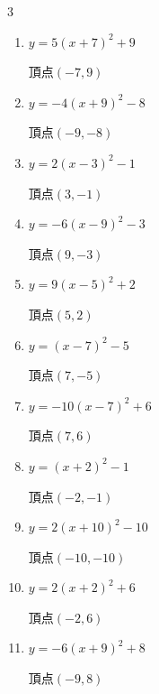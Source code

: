 \begin{multicols}{3}
\begin{enumerate}
        $\displaystyle 頂点\left( 2 , 10 \right)$

  \item $\displaystyle y=5\left( x+7\right)^{2}+9$

        $\displaystyle 頂点\left( -7 , 9 \right)$

  \item $\displaystyle y=-4\left( x+9\right)^{2}-8$

        $\displaystyle 頂点\left( -9 , -8 \right)$

  \item $\displaystyle y=2\left( x-3\right)^{2}-1$

        $\displaystyle 頂点\left( 3 , -1 \right)$

\columnbreak %

\resetques

  \item $\displaystyle y=-6\left( x-9\right)^{2}-3$

        $\displaystyle 頂点\left( 9 , -3 \right)$

  \item $\displaystyle y=9\left( x-5\right)^{2}+2$

        $\displaystyle 頂点\left( 5 , 2 \right)$

  \item $\displaystyle y=\left( x-7\right)^{2}-5$

        $\displaystyle 頂点\left( 7 , -5 \right)$

  \item $\displaystyle y=-10\left( x-7\right)^{2}+6$

        $\displaystyle 頂点\left( 7 , 6 \right)$

  \item $\displaystyle y=\left( x+2\right)^{2}-1$

        $\displaystyle 頂点\left( -2 , -1 \right)$

  \item $\displaystyle y=2\left( x+10\right)^{2}-10$

        $\displaystyle 頂点\left( -10 , -10 \right)$

  \item $\displaystyle y=2\left( x+2\right)^{2}+6$

        $\displaystyle 頂点\left( -2 , 6 \right)$

  \item $\displaystyle y=-6\left( x+9\right)^{2}+8$

        $\displaystyle 頂点\left( -9 , 8 \right)$


\end{enumerate}
\end{multicols}
